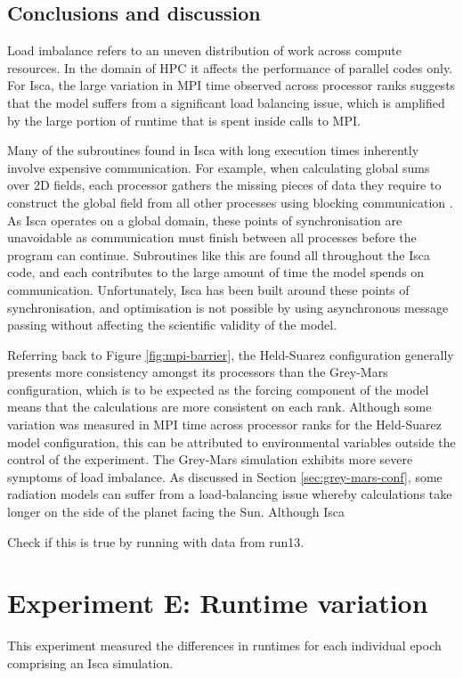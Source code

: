 \documentclass[a4paper,11pt]{report}
\begin{document}
\subsection{Conclusions and discussion}
Load imbalance refers to an uneven distribution of work across compute resources. In the domain of HPC it affects the performance of parallel codes only. For Isca, the large variation in MPI time observed across processor ranks suggests that the model suffers from a significant load balancing issue, which is amplified by the large portion of runtime that is spent inside calls to MPI.
\par
Many of the subroutines found in Isca with long execution times inherently involve expensive communication. For example, when calculating global sums over 2D fields, each processor gathers the missing pieces of data they require to construct the global field from all other processes using blocking communication \cite{schmidt2007benchmark}. As Isca operates on a global domain, these points of synchronisation are unavoidable as communication must finish between all processes before the program can continue. Subroutines like this are found all throughout the Isca code, and each contributes to the large amount of time the model spends on communication. Unfortunately, Isca has been built around these points of synchronisation, and optimisation is not possible by using asynchronous message passing without affecting the scientific validity of the model. 
\par
Referring back to Figure \ref{fig:mpi-barrier}, the Held-Suarez configuration generally presents more consistency amongst its processors than the Grey-Mars configuration, which is to be expected as the forcing component of the model means that the calculations are more consistent on each rank. Although some variation was measured in MPI time across processor ranks for the Held-Suarez model configuration, this can be attributed to environmental variables outside the control of the experiment. The Grey-Mars simulation exhibits more severe symptoms of load imbalance. As discussed in Section \ref{sec:grey-mars-conf}, some radiation models can suffer from a load-balancing issue whereby calculations take longer on the side of the planet facing the Sun. Although Isca 

\par
Check if this is true by running with data from run13. 

\section{Experiment E: Runtime variation}
This experiment measured the differences in runtimes for each individual epoch comprising an Isca simulation.
\end{document}
